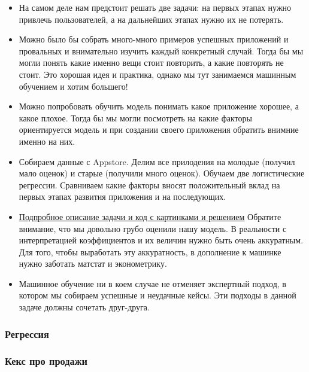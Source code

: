 \documentclass[12pt, a4paper, oneside]{article}
\begin{document}
\begin{itemize}
	\item  На самом деле нам предстоит решать две задачи: на первых этапах нужно привлечь пользователей, а на дальнейших этапах нужно их не потерять. 
	
	\item Можно было бы собрать много-много примеров успешных приложений и провальных и внимательно изучить каждый конкретный случай. Тогда бы мы могли понять какие именно вещи стоит повторить, а какие повторять не стоит. Это хорошая идея и практика, однако мы тут занимаемся машинным обучением и хотим большего! 
	
	\item Можно попробовать обучить модель понимать какое приложение хорошее, а какое плохое. Тогда бы мы могли посмотреть на какие факторы ориентируется модель и при создании своего приложения обратить внимние именно на них. 
	
	\item Собираем данные с Appstore. Делим все прилодения на молодые (получил мало оценок) и старые (получили много оценок). Обучаем две логистические регрессии. Сравниваем какие факторы вносят положительный вклад на первых этапах развития приложения и на последующих. 
	
	\item \href{http://nbviewer.jupyter.org/github/FUlyankin/HSE_Data_Culture/blob/master/ML%20for%20marketing%202018%20autumn/sem_45/2.%20Classification_solution.ipynb}{Подпробное описание задачи и код с картинками и решением} Обратите внимание, что мы довольно грубо оценили нашу модель. В реальности с интерпретацией коэффициентов и их величин нужно быть очень аккуратным. Для того, чтобы выработать эту аккуратность,  в дополнение к машинке нужно заботать матстат и эконометрику.  
	
	\item Машинное обучение ни в коем случае не отменяет экспертный подход, в котором мы собираем успешные и неудачные кейсы. Эти подходы в данной задаче должны сочетать друг-друга. 
\end{itemize}


\subsubsection*{Регрессия} 

\subsubsection*{Кекс про продажи}
\end{document}
